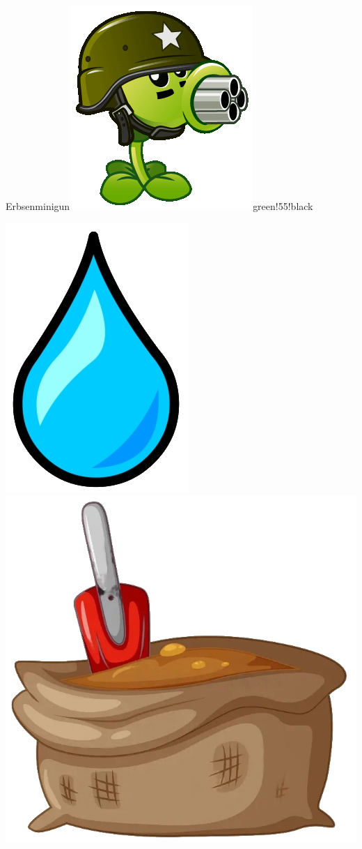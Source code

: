 \documentclass[11pt, a5paper]{article}
\def\now{\hspace{0.2cm}}
\begin{document}
\begin{mybox}{Erbsenminigun}{\includegraphics[scale=0.1]{minigun}}{green!55!black}
\begin{minipage}[t]{\textwidth}
			\now\includegraphics[scale=0.3]{water} 
			\now\includegraphics[scale=0.04]{dirt} 

\end{minipage}
\end{mybox}
\end{document}
